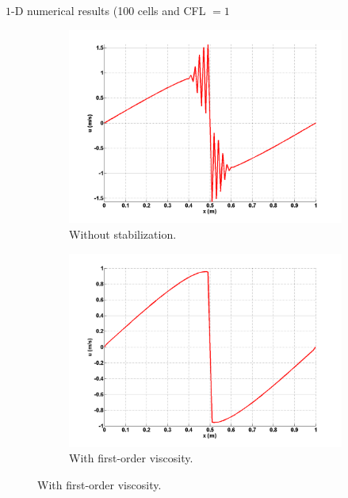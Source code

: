 \documentclass[xcolor=dvipsnames,10pt]{beamer}
\begin{document}
\begin{frame}{$1$-D numerical results (100 cells and CFL $=1$}
\begin{figure}[H]
        \centering
        \begin{subfigure}[b]{0.37\textwidth}
                \centering
                \includegraphics[width=\textwidth]{../figures/1D_sol_free.png}
                \caption{Without stabilization.}
                \label{fig:1d_burger_free}
        \end{subfigure}%
        \begin{subfigure}[b]{0.37\textwidth}
                \centering
                \includegraphics[width=\textwidth]{../figures/1D_sol_fo.png}
                \caption{With first-order viscosity.}
                \label{fig:1d_burger_fo}
        \end{subfigure}
        

\end{figure}
\end{frame}
\end{document}
